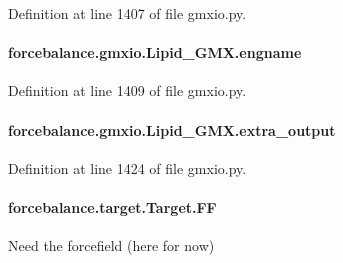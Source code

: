 Definition at line 1407 of file gmxio.\-py.

\hypertarget{classforcebalance_1_1gmxio_1_1Lipid__GMX_a936dee9675f5323cb49f7c918c667898}{
\paragraph[{engname}]{\setlength{\rightskip}{0pt plus 5cm}forcebalance.\-gmxio.\-Lipid\-\_\-\-G\-M\-X.\-engname}}\label{classforcebalance_1_1gmxio_1_1Lipid__GMX_a936dee9675f5323cb49f7c918c667898}


Definition at line 1409 of file gmxio.\-py.

\hypertarget{classforcebalance_1_1gmxio_1_1Lipid__GMX_a6a0cb2f82691a333a63f9280c29da7d8}{
\paragraph[{extra\-\_\-output}]{\setlength{\rightskip}{0pt plus 5cm}forcebalance.\-gmxio.\-Lipid\-\_\-\-G\-M\-X.\-extra\-\_\-output}}\label{classforcebalance_1_1gmxio_1_1Lipid__GMX_a6a0cb2f82691a333a63f9280c29da7d8}


Definition at line 1424 of file gmxio.\-py.

\hypertarget{classforcebalance_1_1target_1_1Target_a38a37919783141ea37fdcf8b00ce0aaf}{
\paragraph[{F\-F}]{\setlength{\rightskip}{0pt plus 5cm}forcebalance.\-target.\-Target.\-F\-F\hspace{0.3cm}{\ttfamily [inherited]}}}\label{classforcebalance_1_1target_1_1Target_a38a37919783141ea37fdcf8b00ce0aaf}


Need the forcefield (here for now) 




